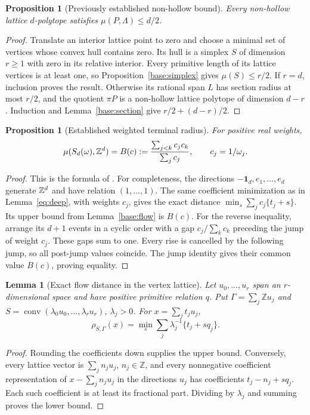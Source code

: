 \documentclass[11pt,a4paper]{article}
\newtheorem{lemma}[theorem]{Lemma}
\newtheorem{proposition}[theorem]{Proposition}
\theoremstyle{remark}\newtheorem{remark}[theorem]{Remark}
\begin{document}
\begin{proposition}[Previously established non-hollow bound]\label{base:nonhollow}
Every non-hollow lattice $d$-polytope satisfies $\mu(P,\Lambda)\le d/2$.
\end{proposition}
\begin{proof}
Translate an interior lattice point to zero and choose a minimal set
of vertices whose convex hull contains zero. Its hull is a simplex
$S$ of dimension $r\ge1$ with zero in its relative interior.
Every primitive length of its lattice vertices is at least one,
so Proposition~\ref{base:simplex} gives $\mu(S)\le r/2$.
If $r=d$, inclusion proves the result. Otherwise its rational span
$L$ has section radius at most $r/2$, and the quotient $\pi P$ is
a non-hollow lattice polytope of dimension $d-r$. Induction and
Lemma~\ref{base:section} give $r/2+(d-r)/2$.
\end{proof}

\begin{proposition}[Established weighted terminal radius]\label{base:weighted}
For positive real weights,
\[
 \mu(S_d(\omega),\mathbb Z^d)=
 B(c):=\frac{\sum_{j<k}c_jc_k}{\sum_jc_j},
 \qquad c_j=1/\omega_j.
\]
\end{proposition}
\begin{proof}
This is the formula of \cite[Theorem 1.4]{CSS}. For completeness,
the directions $-\mathbf1_d,e_1,\ldots,e_d$ generate $\mathbb Z^d$ and
have relation $(1,\ldots,1)$. The same coefficient minimization
as in Lemma~\ref{eq:deep}, with weights $c_j$, gives the exact
distance $\min_s\sum_jc_j\{t_j+s\}$. Its upper bound from
Lemma~\ref{base:flow} is $B(c)$. For the reverse inequality,
arrange its $d+1$ events in a cyclic order with a gap
$c_j/\sum_kc_k$ preceding the jump of weight $c_j$. These gaps
sum to one. Every rise is cancelled by the following jump, so
all post-jump values coincide. The jump identity gives their
common value $B(c)$, proving equality.
\end{proof}


\begin{lemma}[Exact flow distance in the vertex lattice]\label{base:exactflow}
Let $u_0,\ldots,u_r$ span an $r$-dimensional space and have positive
primitive relation $q$. Put $\Gamma=\sum_j\mathbb Zu_j$ and
$S=\operatorname{conv}(\lambda_0u_0,\ldots,\lambda_ru_r)$,
$\lambda_j>0$. For $x=\sum_jt_ju_j$,
\[
 \rho_{S,\Gamma}(x)=
 \min_s\sum_j\lambda_j^{-1}\{t_j+sq_j\}.
\]
\end{lemma}
\begin{proof}
Rounding the coefficients down supplies the upper bound. Conversely,
every lattice vector is $\sum_jn_ju_j$, $n_j\in\mathbb Z$, and every
nonnegative coefficient representation of $x-\sum_jn_ju_j$ in the
directions $u_j$ has coefficients $t_j-n_j+sq_j$. Each such
coefficient is at least its fractional part. Dividing by $\lambda_j$
and summing proves the lower bound.
\end{proof}
\end{document}

